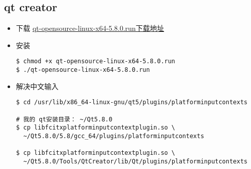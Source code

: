 \subsection{qt creator}
\begin{itemize}
\item 下载
\href{http://iso.mirrors.ustc.edu.cn/qtproject/archive/qt/5.8/5.8.0/qt-opensource-linux-x64-5.8.0.run}{qt-opensource-linux-x64-5.8.0.run下载地址}

\item 安装
\begin{lstlisting}
$ chmod +x qt-opensource-linux-x64-5.8.0.run 
$ ./qt-opensource-linux-x64-5.8.0.run 
\end{lstlisting}

\item 解决中文输入
\begin{lstlisting}
$ cd /usr/lib/x86_64-linux-gnu/qt5/plugins/platforminputcontexts

# 我的 qt安装目录： ~/Qt5.8.0
$ cp libfcitxplatforminputcontextplugin.so \
  ~/Qt5.8.0/5.8/gcc_64/plugins/platforminputcontexts

$ cp libfcitxplatforminputcontextplugin.so \
  ~/Qt5.8.0/Tools/QtCreator/lib/Qt/plugins/platforminputcontexts
\end{lstlisting}
\end{itemize}
